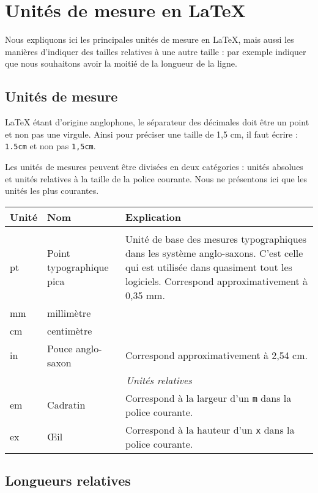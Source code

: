 \chapter{Unités de mesure en \LaTeX{}}\label{unite}

\begin{prealable}
	Nous expliquons ici les principales unités de mesure en \LaTeX{}, mais aussi les manières d'indiquer des tailles relatives à une autre taille : par exemple indiquer que nous souhaitons avoir la moitié de la longueur de la ligne.
\end{prealable}

\section{Unités de mesure}

\LaTeX{} étant d'origine anglophone, le séparateur des décimales doit être un point et non pas une virgule. Ainsi pour préciser une taille de 1,5 cm, il faut écrire : \verb|1.5cm| et non pas \verb|1,5cm|.

Les unités de mesures peuvent être divisées en deux catégories : unités absolues et unités relatives à la taille  de la police courante. Nous ne présentons ici que les unités les plus courantes.



\begin{longtable}{|llp{15em}|}
	\hline
	Unité & Nom & Explication \\
	\endhead
	\hline
	\endfoot
	\multicolumn{3}{c}{\emph{Unités absolues}} \\
	pt & Point typographique pica & Unité de base des mesures typographiques dans les système anglo-saxons. C'est celle qui est utilisée dans quasiment tout les logiciels. Correspond approximativement à 0,35 mm. \\
	mm & millimètre &  \\
	cm  & centimètre & \\
	in    & Pouce anglo-saxon & Correspond approximativement à 2,54 cm. \\
	\multicolumn{3}{c}{\emph{Unités relatives}} \\
	em & Cadratin & Correspond à la largeur d'un \verb|m| dans la police courante. \\
	ex  & Œil & Correspond à la hauteur d'un \verb|x| dans la police courante. \\
\end{longtable}

\section{Longueurs relatives}

